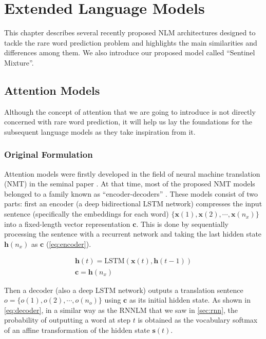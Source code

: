 \chapter{Extended Language Models}

This chapter describes several recently proposed NLM architectures designed to tackle the rare word prediction problem and highlights the main similarities and differences among them. We also introduce our proposed model called ``Sentinel Mixture''.

\section{Attention Models}
\label{sec:attention}

Although the concept of attention that we are going to introduce is not directly concerned with rare word prediction, it will help us lay the foundations for the subsequent language models as they take inspiration from it.

\subsection{Original Formulation}

Attention models were firstly developed in the field of neural machine translation (NMT) in the seminal paper \cite{bahdanau2014neural}. At that time, most of the proposed NMT models belonged to a family known as ``encoder-decoders'' \cite{sutskever2014sequence}. These models consist of two parts: first an encoder (a deep bidirectional LSTM network) compresses the input sentence (specifically the embeddings for each word) $\{\mathbf{x}(1), \mathbf{x}(2), \cdots, \mathbf{x}(n_x)\}$ into a fixed-length vector representation $\mathbf{c}$. This is done by sequentially processing the sentence with a recurrent network and taking the last hidden state $\mathbf{h}(n_x)$ as $\mathbf{c}$ (\autoref{eq:encoder}).

\begin{equation} \label{eq:encoder}
	\begin{gathered}
		\mathbf{h}(t) = \text{LSTM}(\mathbf{x}(t), \mathbf{h}(t-1)) \\
		\mathbf{c} = \mathbf{h}(n_x)
	\end{gathered}
\end{equation}

Then a decoder (also a deep LSTM network) outputs a translation sentence $o=\{o(1), o(2), \cdots, o(n_o)\}$ using $\mathbf{c}$ as its initial hidden state. As shown in \autoref{eq:decoder}, in a similar way as the RNNLM that we saw in \autoref{sec:rnn}, the probability of outputting a word at step $t$ is obtained as the vocabulary softmax of an affine transformation of the hidden state $\mathbf{s}(t)$.

